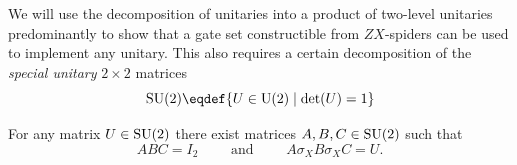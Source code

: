 \documentclass[a4paper, oneside, 12pt]{amsart}
\begin{document}
We will use the decomposition of unitaries into a product of two-level unitaries predominantly to show that a gate set constructible from \(ZX\)-spiders can be used to implement any unitary.
This also requires a certain  decomposition of the \emph{special unitary} \(2\times 2\) matrices
\begin{equation}\label{eq:SU2-defn}
  \SU(2) \eqdef\{ U \in \U(2) \mid \det(U) = 1\}
\end{equation}

\begin{lemma}\label{lem:ABC-decomposition}
  For any matrix \(U\in \operatorname{SU}(2)\) there exist matrices \(A,B,C \in \operatorname{SU}(2)\) such that
  \begin{equation*}
    ABC= I_{2} \qquad \text{ and } \qquad
    A\sigma_{X}B\sigma_{X}C = U.
  \end{equation*}
\end{lemma}
\end{document}
